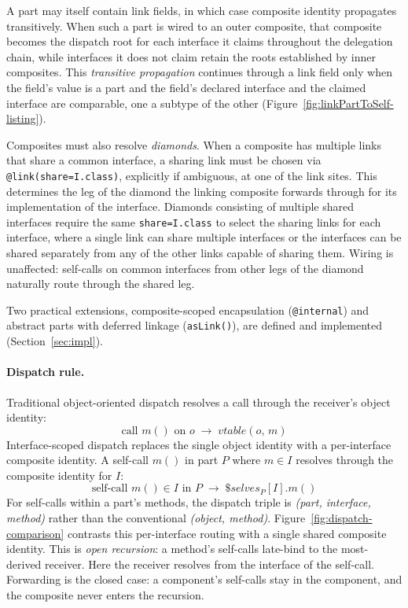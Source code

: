 \documentclass[acmsmall,screen,review,anonymous]{acmart}
\theoremstyle{acmplain}
\newcommand{\code}[1]{\texttt{#1}}
\begin{document}
A part may itself contain link fields, in which case composite identity propagates transitively. When such a part is wired
to an outer composite, that composite becomes the dispatch root for each interface it claims throughout the delegation chain,
while interfaces it does not claim retain the roots established by inner composites. This \emph{transitive propagation}
continues through a link field only when the field's value is a part and the field's declared interface and the claimed
interface are comparable, one a subtype of the other (Figure~\ref{fig:linkPartToSelf-listing}).

Composites must also resolve \emph{diamonds}. When a composite has multiple links that share a common interface, a sharing
link must be chosen via \code{@link(share=I.class)}, explicitly if ambiguous, at one of the link sites. This determines the leg of the diamond the
linking composite forwards through for its implementation of the interface. Diamonds consisting of multiple shared interfaces require the same \code{share=I.class}
to select the sharing links for each interface, where a single link can share multiple interfaces or the interfaces
can be shared separately from any of the other links capable of sharing them. Wiring is unaffected: self-calls on common
interfaces from other legs of the diamond naturally route through the shared leg.

Two practical extensions, composite-scoped encapsulation (\code{@internal}) and abstract parts with deferred linkage (\code{asLink()}),
are defined and implemented (Section~\ref{sec:impl}).

\paragraph{Dispatch rule.}
Traditional object-oriented dispatch resolves a call through the receiver's object identity:
\[ \text{call } m() \text{ on } o \;\longrightarrow\; \mathit{vtable}(o,\, m) \]
Interface-scoped dispatch replaces the single object identity with a per-interface composite identity. A self-call $m()$
in part $P$ where $m \in I$ resolves through the composite identity for $I$:
\[ \text{self-call } m() \in I \text{ in } P \;\longrightarrow\; \$\mathit{selves}_P[I].m() \]
For self-calls within a part's methods, the dispatch triple is \emph{(part, interface, method)} rather than the conventional
\emph{(object, method)}.
Figure~\ref{fig:dispatch-comparison} contrasts this per-interface routing with a single shared composite identity. This is
\emph{open recursion}: a method's self-calls late-bind to the most-derived receiver. Here the receiver resolves from the
interface of the self-call. Forwarding is the closed case: a component's self-calls stay in the component, and the composite
never enters the recursion.
\end{document}

